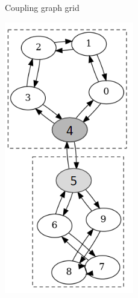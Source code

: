 \begin{figure}[!htb]
\begin{subfigure}{0.25\linewidth}
        \caption{Coupling graph grid}
        \label{fig:coupling-graph-grid}
    \end{subfigure}
    \hfill
    \begin{subfigure}{0.2\linewidth}
        \includegraphics[width=\linewidth]{image/coupling_graph_ring.png}

\end{subfigure}
\end{figure}
